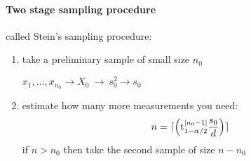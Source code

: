 \paragraph{Two stage sampling procedure}
called Stein's sampling procedure:
\begin{enumerate}
  \item take a preliminary sample of small size $n_0$
  
  $x_1, \ldots, x_{n_0} \rightarrow X_0 \ \longrightarrow \ s^2_0 \rightarrow s_0$
  
  \item estimate how many more measurements you need:
  \begin{gather*}
  n = \lceil \left( \textrm{t}^{[n_0-1]}_{1-\alpha/2} \frac{s_0}{d} \right) \rceil
  \end{gather*}
  if $n > n_0$ then take the second sample of size $n-n_0$
  
\end{enumerate}
